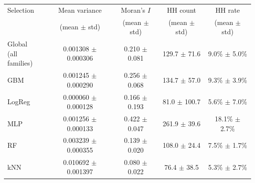 \begin{tabular}{lcccc}
\hline
Selection & Mean variance & Moran's $I$ & HH count & HH rate \\
 & (mean $\pm$ std) & (mean $\pm$ std) & (mean $\pm$ std) & (mean $\pm$ std) \\
\hline
\shortstack[c]{Global\\(all families)} & 0.001308 $\pm$ 0.000306 & 0.210 $\pm$ 0.081 & 129.7 $\pm$ 71.6 & 9.0\% $\pm$ 5.0\% \\
\hline
GBM & 0.001245 $\pm$ 0.000290 & 0.256 $\pm$ 0.068 & 134.7 $\pm$ 57.0 & 9.3\% $\pm$ 3.9\% \\
LogReg & 0.000060 $\pm$ 0.000128 & 0.166 $\pm$ 0.193 & 81.0 $\pm$ 100.7 & 5.6\% $\pm$ 7.0\% \\
MLP & 0.001256 $\pm$ 0.000133 & 0.422 $\pm$ 0.047 & 261.9 $\pm$ 39.6 & 18.1\% $\pm$ 2.7\% \\
RF & 0.003239 $\pm$ 0.000355 & 0.139 $\pm$ 0.020 & 108.0 $\pm$ 24.4 & 7.5\% $\pm$ 1.7\% \\
kNN & 0.010692 $\pm$ 0.001397 & 0.080 $\pm$ 0.022 & 76.4 $\pm$ 38.5 & 5.3\% $\pm$ 2.7\% \\
\hline
\end{tabular}